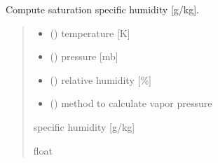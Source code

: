\documentclass[letterpaper,10pt,english]{sphinxmanual}
\begin{document}
\begin{fulllineitems}
\label{\detokenize{users_guide:AirSeaFluxCode.hum_subs.qsat_air}}
\pysigstartsignatures
\pysiglinewithargsret
{}
{\sphinxparamcomma {}\sphinxparamcomma {}\sphinxparamcomma {}}
{}
\pysigstopsignatures
\sphinxAtStartPar
Compute saturation specific humidity {[}g/kg{]}.
\begin{quote}\begin{description}
\begin{itemize}
\item {}
\sphinxAtStartPar
{} () \textendash{} temperature {[}K{]}

\item {}
\sphinxAtStartPar
{} () \textendash{} pressure {[}mb{]}

\item {}
\sphinxAtStartPar
{} () \textendash{} relative humidity {[}\%{]}

\item {}
\sphinxAtStartPar
{} () \textendash{} method to calculate vapor pressure

\end{itemize}

\sphinxAtStartPar
{} \textendash{} specific humidity {[}g/kg{]}

\sphinxAtStartPar
float

\end{description}\end{quote}

\end{fulllineitems}

\end{document}
